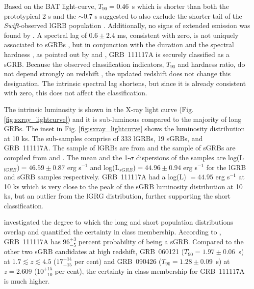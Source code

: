 \documentclass{aa}    %
\begin{document}
Based on the BAT light-curve, $T_{90}=0.46$~s which is shorter than both the
prototypical 2 s \citep{Kouveliotou1993} and the $\sim$0.7 s suggested to also
exclude the shorter tail of the \textit{Swift}-observed lGRB population
\citep{Bromberg2012a}. Additionally, no signs of extended emission was found by
\citep{Sakamoto2013}. A spectral lag of $0.6 \pm2.4$ ms, consistent with zero,
is not uniquely associated to sGRBs \citep{Bernardini2014}, but in conjunction
with the duration and the spectral hardness \citep{Sakamoto2011}, as pointed out
by \citet{Margutti2012} and \citet{Sakamoto2013}, GRB~111117A is securely
classified as a sGRB. Because the observed classification indicators, $T_{90}$
and hardness ratio, do not depend strongly on redshift \citep{Littlejohns2013a},
the updated redshift does not change this designation. The intrinsic spectral
lag shortens, but since it is already consistent with zero, this does not affect
the classification.

The intrinsic luminosity is shown in the X-ray light curve (Fig.
\ref{fig:sxray_lightcurve}) and it is sub-luminous compared to the majority of
long GRBs. The inset in Fig. \ref{fig:sxray_lightcurve} shows the luminosity
distribution at 10 ks. The sub-samples comprise of 333 lGRBs, 19 sGRBs, and
GRB~111117A. The sample of lGRBs are from \citet{Evans2007, Evans2009} and the
sample of sGRBs are compiled from \citet{Kann2011, Berger2014} and
\citet{DAvanzo2014a}. The mean and the 1-$\sigma$ dispersions of the samples are
log(L$_{lGRB}$)$ = 46.59 \pm 0.87$ erg s$^{-1}$ and log(L$_{sGRB}$)$  = 44.96
\pm 0.94$ erg s$^{-1}$ for the lGRB and sGRB samples respectively. GRB~111117A
had a log(L) $= 44.95$ erg s$^{-1}$ at 10 ks which is very close to the peak of
the sGRB luminosity distribution at 10 ks, but an outlier from the lGRG
distribution, further supporting the short classification.

\citet{Bromberg2013} investigated the degree to which the long and short
population distributions overlap and quantified the certainty in class
membership. According to \citet{Bromberg2013}, GRB~111117A has $96_{-5}^{+3}$
percent probability of being a sGRB. Compared to the other two sGRB candidates
at high redshift, GRB~060121 ($T_{90}=1.97 \pm 0.06$~s)
\citep{DeUgartePostigo2006, Levan2006} at $1.7 \lesssim z \lesssim 4.5$
($17_{-15}^{+14}$ per cent) and GRB~090426 ($T_{90}=1.28 \pm 0.09$~s)
\citep{Antonelli2009, Levesque2010, Thone2011} at $z = 2.609$ ($10_{-10}^{+15}$
per cent), the certainty in class membership for GRB~111117A is much higher.
\end{document}
